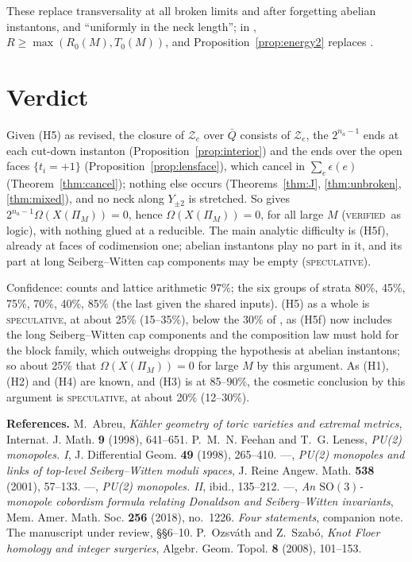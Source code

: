 \documentclass[10pt]{amsart}
\makeatletter
\numberwithin{equation}{section}
\theoremstyle{compact}
\newcommand{\cZ}{\mathcal Z}
\newcommand{\ver}{\textsc{verified}}
\newcommand{\spe}{\textsc{speculative}}
\renewenvironment{thebibliography}[1]{\par\footnotesize\noindent
  \textbf{References.}\ignorespaces
  \def\@lbibitem[##1]##2{\unskip\hskip.5em plus.3em minus.1em[##1]~\if@filesw\immediate
    \write\@auxout{\string\bibcite{##2}{##1}}\fi\ignorespaces}%
  \def\bysame{---}}{\par}
\makeatother
\begin{document}
\noindent These replace transversality at all broken limits and after
forgetting abelian instantons, and ``uniformly in the neck length''; in
\cite[Thm.~4.3]{FS}, $R\ge\max(R_0(M),T_0(M))$, and
Proposition~\ref{prop:energy2} replaces \cite[Prop.~4.2]{FS}.

\section*{Verdict}

Given (H5) as revised, the closure of $\cZ_e$ over $\bar Q$ consists of
$\cZ_e$, the $2^{n_a-1}$ ends at each cut-down instanton
(Proposition~\ref{prop:interior}) and the ends over the open faces
$\{t_i=+1\}$ (Proposition~\ref{prop:lensface}), which cancel in
$\sum_e\epsilon(e)$ (Theorem~\ref{thm:cancel}); nothing else occurs
(Theorems~\ref{thm:J}, \ref{thm:unbroken}, \ref{thm:mixed}), and no neck along
$Y_{\pm2}$ is stretched. So \cite[Thm.~4.1]{FS} gives
$2^{n_a-1}\Omega(X(\Pi_M))=0$, hence $\Omega(X(\Pi_M))=0$, for all large $M$
(\ver\ as logic), with nothing glued at a reducible. The main analytic
difficulty is (H5f), already at faces of codimension one; abelian instantons
play no part in it, and its part at long Seiberg--Witten cap components may be
empty (\spe).

Confidence: counts and lattice arithmetic 97\%; the six groups of strata 80\%,
45\%, 75\%, 70\%, 40\%, 85\% (the last given the shared inputs). (H5) as a whole
is \spe, at about 25\% (15--35\%), below the 30\% of \cite{FS}, as (H5f) now
includes the long Seiberg--Witten cap components and the composition law must
hold for the block family, which outweighs dropping the hypothesis at abelian
instantons; so about 25\% that $\Omega(X(\Pi_M))=0$ for large $M$ by this argument.
As (H1), (H2) and (H4) are known, and (H3) is at 85--90\%, the cosmetic
conclusion by this argument is \spe, at about 20\% (12--30\%).

\begin{thebibliography}{FL2b}
 M.~Abreu, \emph{K\"ahler geometry of toric varieties and
extremal metrics}, Internat. J. Math. \textbf{9} (1998), 641--651.
 P.~M.~N. Feehan and T.~G. Leness, \emph{PU(2) monopoles.
I}, J. Differential Geom. \textbf{49} (1998), 265--410.
 \bysame, \emph{PU(2) monopoles and links of top-level
Seiberg--Witten moduli spaces}, J. Reine Angew. Math. \textbf{538} (2001),
57--133.
 \bysame, \emph{PU(2) monopoles. II}, ibid., 135--212.
 \bysame, \emph{An $\mathrm{SO}(3)$-monopole cobordism
formula relating Donaldson and Seiberg--Witten invariants}, Mem. Amer. Math.
Soc. \textbf{256} (2018), no.~1226.
 \emph{Four statements}, companion note.
 The manuscript under review, \S\S6--10.
 P.~Ozsv\'ath and Z.~Szab\'o, \emph{Knot Floer homology and
integer surgeries}, Algebr. Geom. Topol. \textbf{8} (2008), 101--153.
\end{thebibliography}
\end{document}
